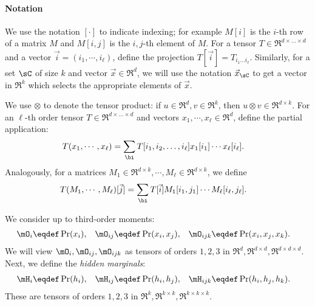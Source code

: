 \paragraph{Notation}

We use the notation $[\cdot]$ to indicate indexing; for example $M[i]$
  is the $i$-th row of a matrix $M$ and $M[i,j]$ is the $i,j$-th element
  of $M$.
For a tensor $T \in \Re^{d \times \ldots \times d}$ and a vector $\vec
  i = (i_1, \cdots, i_\ell)$, define the projection $T[\vec i] = T_{i_1 \ldots i_\ell}$.
Similarly, for a set $\sC$ of size $k$ and vector $\vec x \in \Re^d$, we
  will use the notation $\vec x_\sC$ to get a vector in $\Re^k$ which selects
  the appropriate elements of $\vec x$.

We use $\otimes$ to denote the tensor product: if $u \in \Re^d,
  v \in \Re^k$, then $u \otimes v \in \Re^{d \times k}$.
For an $\ell$-th order tensor $T \in \Re^{d \times \ldots \times
  d}$ and vectors $x_1, \cdots, x_\ell \in \Re^{d}$, define 
  the partial application:
\begin{align*}
  T(x_1, \cdots, x_\ell) 
  &= \sum_{\bi}
            T[i_1, i_2, \ldots, i_\ell] x_1[i_1] \cdots x_\ell[i_\ell].
\end{align*}
Analogously, for a matrices $M_1 \in \Re^{d \times k}, \cdots,
  M_\ell \in \Re^{d \times k}$, we define
\begin{align*}
  T(M_1, \cdots, M_\ell)[\vec j]
  &= \sum_{\bi}
            T[\vec i] {M_1}[i_1,j_1] \cdots M_\ell[i_\ell, j_\ell].
\end{align*}

We consider up to third-order moments:
\begin{align*}
  \mO_i &\eqdef \Pr(x_i), &
  \mO_{ij} &\eqdef \Pr(x_i, x_j), &
  \mO_{ijk} &\eqdef \Pr(x_i, x_j, x_k).
\end{align*}
We will view $\mO_i, \mO_{ij}, \mO_{ijk}$ as tensors of
  orders $1, 2, 3$ in $\Re^d, \Re^{d\times d}, \Re^{d \times d \times d}$.
Next, we define the \emph{hidden marginals}:
\begin{align*}
  \mH_i &\eqdef \Pr(h_i), &
  \mH_{ij} &\eqdef \Pr(h_i, h_j), &
  \mH_{ijk} &\eqdef \Pr(h_i, h_j, h_k).
\end{align*}
These are tensors of
  orders $1, 2, 3$ in $\Re^k, \Re^{k\times k}, \Re^{k \times k \times k}$.

